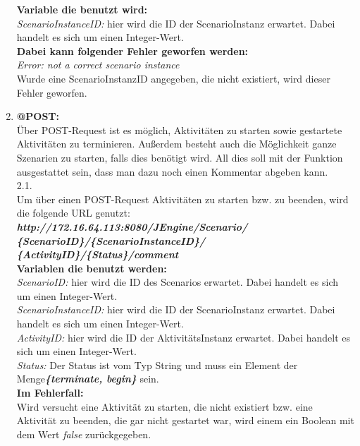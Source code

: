 \documentclass{acm_proc_article-sp}
\begin{document}
\begin{enumerate}
\textbf{Variable die benutzt wird:}\\
\textit{ScenarioInstanceID:} hier wird die ID der ScenarioInstanz erwartet. Dabei handelt es sich um einen Integer-Wert.\\

\textbf{Dabei kann folgender Fehler geworfen werden:}\\
\textit{Error: not a correct scenario instance} \\ Wurde eine ScenarioInstanzID angegeben, die nicht existiert, wird dieser Fehler geworfen.\\

\item \textbf{@POST:}\\
Über POST-Request ist es möglich, Aktivitäten zu starten sowie gestartete Aktivitäten zu terminieren. Außerdem besteht auch die Möglichkeit ganze Szenarien zu starten, falls dies benötigt wird. All dies soll mit der Funktion ausgestattet sein, dass man dazu noch einen Kommentar abgeben kann.\\

2.1.\\ Um über einen POST-Request Aktivitäten zu starten bzw. zu beenden, wird die folgende URL genutzt:\\
\textit{\textbf{http://172.16.64.113:8080/JEngine/Scenario/\\\{ScenarioID\}/\{ScenarioInstanceID\}/\\\{ActivityID\}/\{Status\}/comment}}\\

\textbf{Variablen die benutzt werden:}\\
\textit{ScenarioID:} hier wird die ID des Scenarios erwartet. Dabei handelt es sich um einen Integer-Wert.\\
\textit{ScenarioInstanceID:} hier wird die ID der ScenarioInstanz erwartet. Dabei handelt es sich um einen Integer-Wert.\\
\textit{ActivityID:} hier wird die ID der AktivitätsInstanz erwartet. Dabei handelt es sich um einen Integer-Wert.\\
\textit{Status:} Der Status ist vom Typ String und muss ein Element der Menge\textbf{\textit{\{terminate, begin\}}} sein.\\

\textbf{Im Fehlerfall:}\\
Wird versucht eine Aktivität zu starten, die nicht existiert bzw. eine Aktivität zu beenden, die gar nicht gestartet war, wird einem ein Boolean mit dem Wert \textit{false} zurückgegeben.\\


\end{enumerate}
\end{document}
